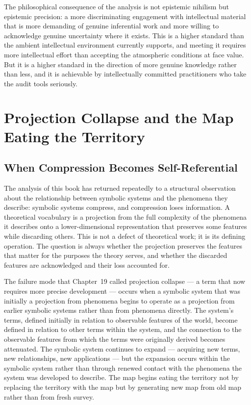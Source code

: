 \documentclass[12pt, openright, twoside]{book}
\begin{document}
The philosophical consequence of the analysis is not epistemic nihilism
but epistemic precision: a more discriminating engagement with intellectual
material that is more demanding of genuine inferential work and more
willing to acknowledge genuine uncertainty where it exists. This is a
higher standard than the ambient intellectual environment currently
supports, and meeting it requires more intellectual effort than accepting
the atmospheric conditions at face value. But it is a higher standard
in the direction of more genuine knowledge rather than less, and it is
achievable by intellectually committed practitioners who take the audit
tools seriously.

\chapter{Projection Collapse and the Map Eating the Territory}

\section{When Compression Becomes Self-Referential}

The analysis of this book has returned repeatedly to a structural
observation about the relationship between symbolic systems and the
phenomena they describe: symbolic systems compress, and compression
loses information. A theoretical vocabulary is a projection from the
full complexity of the phenomena it describes onto a lower-dimensional
representation that preserves some features while discarding others.
This is not a defect of theoretical work; it is its defining operation.
The question is always whether the projection preserves the features
that matter for the purposes the theory serves, and whether the
discarded features are acknowledged and their loss accounted for.

The failure mode that Chapter~19 called projection collapse --- a term
that now requires more precise development --- occurs when a symbolic
system that was initially a projection from phenomena begins to operate
as a projection from earlier symbolic systems rather than from phenomena
directly. The system's terms, defined initially in relation to observable
features of the world, become defined in relation to other terms within
the system, and the connection to the observable features from which
the terms were originally derived becomes attenuated. The symbolic system
continues to expand --- acquiring new terms, new relationships, new
applications --- but the expansion occurs within the symbolic system
rather than through renewed contact with the phenomena the system was
developed to describe. The map begins eating the territory not by
replacing the territory with the map but by generating new map from
old map rather than from fresh survey.
\end{document}
